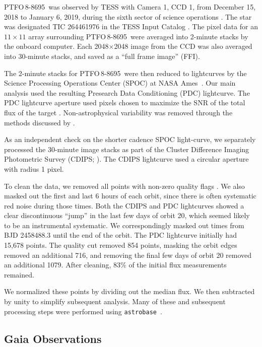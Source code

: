 \documentclass[12pt,twocolumn,tighten]{aastex62}
\newcommand{\ptfo}{PTFO$\,$8-8695}
\begin{document}
\ptfo\ was observed by TESS with Camera 1, CCD 1, from December 15,
2018 to January 6, 2019, during the sixth sector of science operations
\citep{ricker_transiting_2015}.  The star was designated TIC 264461976
in the TESS Input Catalog \citep{stassun_TIC_2018,stassun_TIC8_2019}.
The pixel data for an $11\times11$ array surrounding \ptfo\ were
averaged into 2-minute stacks by the onboard computer.  Each
2048$\times$2048 image from the CCD was also averaged into 30-minute
stacks, and saved as a ``full frame image'' (FFI).

The 2-minute stacks for \ptfo\ were then reduced to lightcurves by the
Science Processing Operations Center (SPOC) at NASA
Ames~\citep{jenkins_tess_2016}.  Our main analysis used the resulting
Presearch Data Conditioning (PDC) lightcurve.  The PDC lightcurve
aperture used pixels chosen to maximize the SNR of the total flux of
the target \citep{smith_kepler_apertures_2017}.  Non-astrophysical
variability was removed through the methods discussed by
\citet{smith_kepler_PDC_2017}.

As an independent check on the shorter cadence SPOC light-curve, we
separately processed the 30-minute image stacks as part of the Cluster
Difference Imaging Photometric Survey (CDIPS;
\citealt{bouma_cluster_2019}).  The CDIPS lightcurve used a circular
aperture with radius 1 pixel.

To clean the data, we removed all points with non-zero quality flags
\citep[{\it e.g.},][]{tess_data_product_description_2018}.  We also
masked out the first and last 6 hours of each orbit, since there is
often systematic red noise during those times.  Both the CDIPS and PDC
lightcurves showed a clear discontinuous ``jump'' in the last few days
of orbit 20, which seemed likely to be an instrumental systematic.  We
correspondingly masked out times from BJD 2458488.3 until the end of
the orbit.  The PDC lightcurve initially had 15{,}678 points.  The
quality cut removed 854 points, masking the orbit edges removed an
additional 716, and removing the final few days of orbit 20 removed an
additional 1079.  After cleaning, 83\% of the initial flux
measurements remained.

We normalized these points by dividing out the median flux. We then
subtracted by unity to simplify subsequent analysis.  Many of these
and subsequent processing steps were performed using
\texttt{astrobase}~\citep{bhatti_astrobase_2018}. 


\subsection{Gaia Observations}
\end{document}
